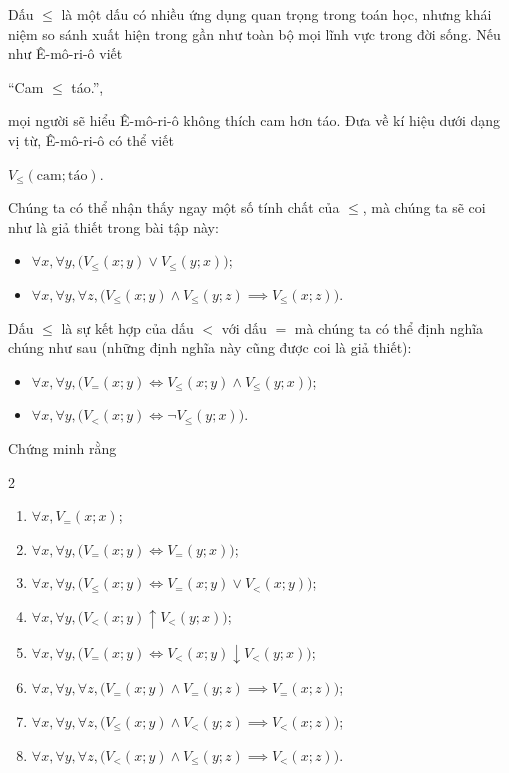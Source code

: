 \exercise Dấu $\le$ là một dấu có nhiều ứng dụng quan trọng trong toán học, nhưng khái niệm so sánh xuất hiện trong gần như toàn bộ mọi lĩnh vực trong đời sống. Nếu như Ê-mô-ri-ô viết
\begin{center}
    ``Cam $\le$ táo.'', 
\end{center}
mọi người sẽ hiểu Ê-mô-ri-ô không thích cam hơn táo. Đưa về kí hiệu dưới dạng vị từ, Ê-mô-ri-ô có thể viết
\begin{center}
    $V_\le (\text{cam}; \text{táo})$.
\end{center}
Chúng ta có thể nhận thấy ngay một số tính chất của $\le$, mà chúng ta sẽ coi như là giả thiết trong bài tập này:
\begin{itemize}
    \item $\forall x, \forall y, \big(V_\le(x; y) \lor V_\le(y; x)\big)$;
    \item $\forall x, \forall y, \forall z, \big(V_\le(x; y) \land V_\le(y; z) \implies V_\le(x; z)\big)$.
\end{itemize}
Dấu $\le$ là sự kết hợp của dấu $<$ với dấu $=$ mà chúng ta có thể định nghĩa chúng như sau (những định nghĩa này cũng được coi là giả thiết):
\begin{itemize}
    \item $\forall x, \forall y, \big(V_=(x; y) \iff V_\le(x; y) \land V_\le(y; x)\big)$;
    \item $\forall x, \forall y, \big(V_<(x; y) \iff \neg V_\le(y; x)\big)$.
\end{itemize}
Chứng minh rằng
\begin{multicols}{2}
   \begin{enumerate}
      \item $\forall x, V_=(x; x)$;
      \item $\forall x, \forall y, \big(V_=(x; y) \iff V_=(y; x)\big)$;
      \item $\forall x, \forall y, \big(V_\le(x; y) \iff V_=(x; y) \lor V_<(x; y)\big)$;
      \item $\forall x, \forall y, \big(V_<(x; y) \uparrow V_<(y; x)\big)$;
      \item $\forall x, \forall y, \big(V_=(x; y) \iff V_<(x; y) \downarrow V_<(y; x)\big)$;
      \item $\forall x, \forall y, \forall z, \big(V_=(x; y) \land V_=(y; z) \implies V_=(x; z)\big)$;
      \item $\forall x, \forall y, \forall z, \big(V_\le(x; y) \land V_<(y; z) \implies V_<(x; z)\big)$;
      \item $\forall x, \forall y, \forall z, \big(V_<(x; y) \land V_\le(y; z) \implies V_<(x; z)\big)$.
   \end{enumerate}
\end{multicols}

